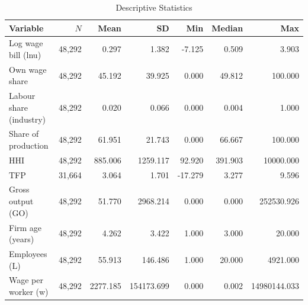 \begin{table}[htbp]
\centering
\footnotesize
\caption{Descriptive Statistics}
\label{tab:desc_stats}
\begin{tabular}{lrrrrrr}
\hline\hline
Variable & $N$ & Mean & SD & Min & Median & Max \\
\hline
Log wage bill (lnu) & 48,292 & 0.297 & 1.382 & -7.125 & 0.509 & 3.903 \\
Own wage share & 48,292 & 45.192 & 39.925 & 0.000 & 49.812 & 100.000 \\
Labour share (industry) & 48,292 & 0.020 & 0.066 & 0.000 & 0.004 & 1.000 \\
Share of production & 48,292 & 61.951 & 21.743 & 0.000 & 66.667 & 100.000 \\
HHI & 48,292 & 885.006 & 1259.117 & 92.920 & 391.903 & 10000.000 \\
TFP & 31,664 & 3.064 & 1.701 & -17.279 & 3.277 & 9.596 \\
Gross output (GO) & 48,292 & 51.770 & 2968.214 & 0.000 & 0.000 & 252530.926 \\
Firm age (years) & 48,292 & 4.262 & 3.422 & 1.000 & 3.000 & 20.000 \\
Employees (L) & 48,292 & 55.913 & 146.486 & 1.000 & 20.000 & 4921.000 \\
Wage per worker (w) & 48,292 & 2277.185 & 154173.699 & 0.000 & 0.002 & 14980144.033 \\
\hline\hline
\end{tabular}
\end{table}
